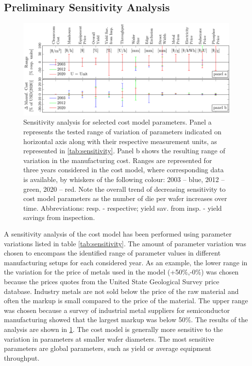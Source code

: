 \documentclass[10pt]{article}
\begin{document}
\newpage
\subsection{Preliminary Sensitivity Analysis}

\begin{figure}[]
	\centering
    \includegraphics[width=\textwidth]{2_SSL_EST/article/figures/costmodel_sensitivity.pdf}
	\caption{Sensitivity analysis for selected cost model parameters. Panel a represents the tested range of variation of parameters indicated on horizontal axis along with their respective measurement units, as represented in \cref{tab:sensitivity}. Panel b shows the resulting range of variation in the manufacturing cost. Ranges are represented for three years considered in the cost model, where corresponding data is available, by whiskers of the following colour: 2003 – blue, 2012 – green, 2020 – red. Note the overall trend of decreasing sensitivity to cost model parameters as the number of die per wafer increases over time. Abbreviations: resp. - respective; yield sav. from insp. - yield savings from inspection.}
	\label{fig:sensitivity}
\end{figure}

A sensitivity analysis of the cost model has been performed using parameter variations listed in table \cref{tab:sensitivity}. The amount of parameter variation was chosen to encompass the identified range of parameter values in different manufacturing setups for each considered year. As an example, the lower range in the variation for the price of metals used in the model (+50\%,-0\%) was chosen because the prices quotes from the United State Geological Survey price database. Industry metals are not sold below the price of the raw material and often the markup is small compared to the price of the material. The upper range was chosen because a survey of industrial metal suppliers for semiconductor manufacturing showed that the largest markup was below 50\%. The results of the analysis are shown in  \cref{fig:sensitivity}. The cost model is generally more sensitive to the variation in parameters at smaller wafer diameters. The most sensitive parameters are global parameters, such as yield or average equipment throughput.
\end{document}
